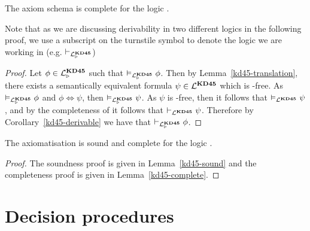 \begin{lemma}\label{kd45-complete}
The axiom schema \axiomKDF{} is complete for the logic \logicKDF{}.
\end{lemma}

Note that as we are discussing derivability in two different logics in the
following proof, we use a subscript on the turnstile symbol to denote the logic
we are working in (e.g. $\vdash_{\mathcal{L}^{\mathbf{KD45}}_{\mathopen{\triangleright}}}$)

\begin{proof}
Let $\phi \in \mathcal{L}^{\mathbf{KD45}}_{\mathopen{\triangleright}}$ such that $\vDash_{\mathcal{L}^{\mathbf{KD45}}_{\mathopen{\triangleright}}} \phi$. Then by
Lemma~\ref{kd45-translation}, there exists a semantically equivalent formula
$\psi \in \mathcal{L}^{\mathbf{KD45}}$ which is \somerefs-free. As $\vDash_{\mathcal{L}^{\mathbf{KD45}}_{\mathopen{\triangleright}}} \phi$ and
$\phi \iff \psi$, then $\vDash_{\mathcal{L}^{\mathbf{KD45}}_{\mathopen{\triangleright}}} \psi$. As $\psi$ is
\somerefs-free, then it follows that $\vDash_{\mathcal{L}^{\mathbf{KD45}}} \psi$, and by the
completeness of \axiomKDF{} it follows that $\vdash_{\mathcal{L}^{\mathbf{KD45}}} \psi$.
Therefore by Corollary~\ref{kd45-derivable} we have that $\vdash_{\mathcal{L}^{\mathbf{KD45}}_{\mathopen{\triangleright}}}
\phi$.
\end{proof}

\begin{theorem}
The axiomatisation \axiomKDF{} is sound and complete for the logic \logicKDF{}.
\end{theorem}

\begin{proof}
The soundness proof is given in Lemma~\ref{kd45-sound} and the completeness
proof is given in Lemma~\ref{kd45-complete}.
\end{proof}


\section{Decision procedures}
